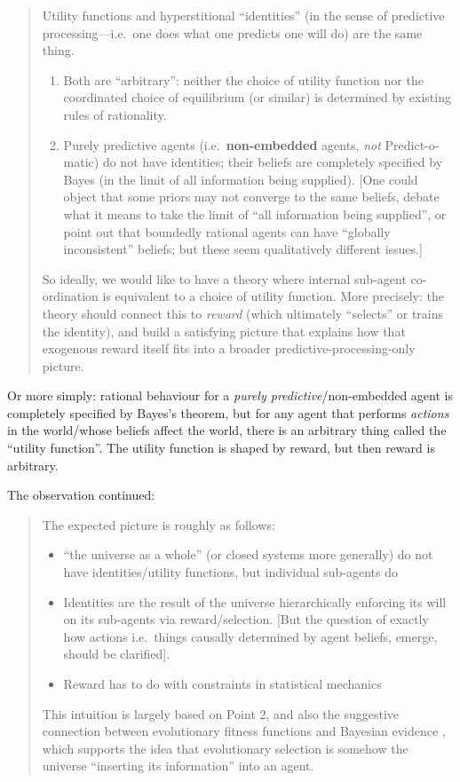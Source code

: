 \begin{quote}
Utility functions and hyperstitional ``identities'' (in the sense of predictive
processing---i.e.\ one does what one predicts one will do) are the same thing.
\begin{enumerate}
  \item Both are ``arbitrary'': neither the choice of utility function nor the coordinated
  choice of equilibrium (or similar) is determined by existing rules of rationality.
  \item Purely predictive agents (i.e.\ \textbf{non-embedded} agents, \emph{not}
  Predict-o-matic) do not have identities; their beliefs are completely specified by Bayes
  (in the limit of all information being supplied). [One could object that some
  priors may not converge to the same beliefs, debate what it means to take the limit of
  ``all information being supplied'', or point out that boundedly rational agents can have
  ``globally inconsistent'' beliefs; but these seem qualitatively different issues.]
\end{enumerate}
So ideally, we would like to have a theory where internal sub-agent co-ordination is
equivalent to a choice of utility function. More precisely: the theory should connect this
to \emph{reward} (which ultimately ``selects'' or trains the identity), and build a
satisfying picture that explains how that exogenous reward itself fits into a broader
predictive-processing-only picture.
\end{quote}

Or more simply: rational behaviour for a \emph{purely predictive}/non-embedded agent is
completely specified by Bayes's theorem, but for any agent that performs \emph{actions} in
the world/whose beliefs affect the world, there is an arbitrary thing called the ``utility
function''. The utility function is shaped by reward, but then reward is arbitrary.

The observation continued:

\begin{quote}
The expected picture is roughly as follows:
\begin{itemize}
  \item ``the universe as a whole'' (or closed systems more generally) do not have
  identities/utility functions, but individual sub-agents do
  \item Identities are the result of the universe hierarchically enforcing its will on its
  sub-agents via reward/selection. [But the question of exactly how actions i.e.\ things
  causally determined by agent beliefs, emerge, should be clarified].
  \item Reward has to do with constraints in statistical mechanics
\end{itemize}
This intuition is largely based on Point 2, and also the suggestive connection between
evolutionary fitness functions and Bayesian evidence
\citep[``The Replicator Equation as an Inference Dynamic'',][]{harperReplicatorEquationInference2009}, which supports the idea that evolutionary selection is somehow the universe
``inserting its information'' into an agent.
\end{quote}

